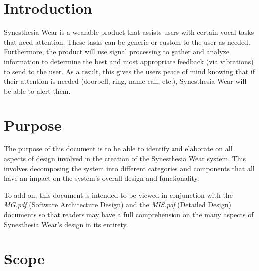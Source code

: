 \documentclass[12pt, titlepage]{article}
\begin{document}

\section{Introduction}
Synesthesia Wear is a wearable product that assists users with certain vocal tasks 
that need attention. These tasks can be generic or custom to the user as needed. 
Furthermore, the product will use signal processing to gather and analyze information 
to determine the best and most appropriate feedback (via vibrations) to send to the 
user. As a result, this gives the users peace of mind knowing that if their attention 
is needed (doorbell, ring, name call, etc.), Synesthesia Wear will be able to alert them.

\section{Purpose}
The purpose of this document is to be able to identify and elaborate on all aspects of design involved
in the creation of the Synesthesia Wear system. This involves decomposing the system into different categories and components 
that all have an impact on the system's overall design and functionality.

To add on, this document is intended to be viewed in conjunction with the \href{https://github.com/jordanbierbrier/capstone/blob/main/docs/Design/SoftArchitecture/MG.pdf}{\textit{MG.pdf}} (Software Architecture Design) 
and the \href{https://github.com/jordanbierbrier/capstone/blob/main/docs/Design/SoftDetailedDes/MIS.pdf}{\textit{MIS.pdf}} (Detailed Design) documents so that readers may have a full comprehension on the many aspects of Synesthesia 
Wear's design in its entirety. 

\section{Scope}
\end{document}
